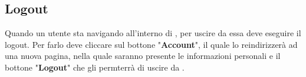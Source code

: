 {{    }
    
    \subsection{Logout} {
        Quando un utente sta navigando all'interno di \platform, per uscire da essa deve eseguire il logout. Per farlo deve cliccare sul bottone "\textbf{Account}", il quale lo reindirizzerà ad una nuova pagina,
        nella quale saranno presente le informazioni personali e il bottone "\textbf{Logout}" che gli permterrà di uscire da \platform. 
          
    }




}
